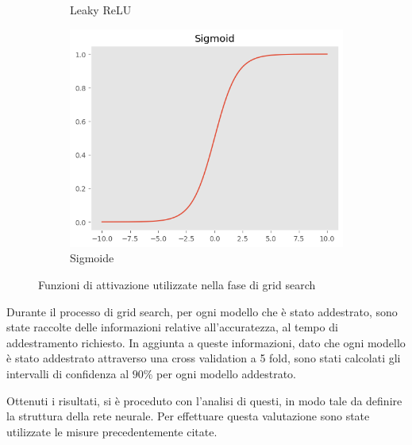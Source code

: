 \begin{figure}[!ht]
\begin{subfigure}[b]{0.3\textwidth}
        \caption{Leaky ReLU}
        \label{fig:leaky-relu}
    \end{subfigure}
    \hfill
    \begin{subfigure}[b]{0.3\textwidth}
        \centering
        \includegraphics[width=\textwidth]{img/rete/sigmoid.png}
        \caption{Sigmoide}
        \label{fig:sigmoid}
    \end{subfigure}
    \caption{Funzioni di attivazione utilizzate nella fase di grid search}
    \label{fig:}
\end{figure}

Durante il processo di grid search, per ogni modello che è stato addestrato, sono
state raccolte delle informazioni relative all'accuratezza, al tempo di addestramento
richiesto. In aggiunta a queste informazioni, dato che ogni modello è stato
addestrato attraverso una cross validation a 5 fold, sono stati calcolati gli
intervalli di confidenza al $90\%$ per ogni modello addestrato.

Ottenuti i risultati, si è proceduto con l'analisi di questi, in modo tale da
definire la struttura della rete neurale. Per effettuare questa valutazione sono
state utilizzate le misure precedentemente citate.

